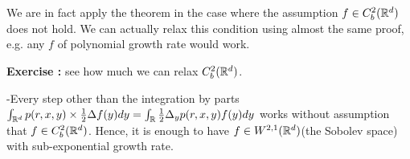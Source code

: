 \documentclass[10pt,a4paper]{report}
\newenvironment{proof}
{\begin{changemargin}{1cm}{0.5cm} 
	}%
	{\end{changemargin}
}
\begin{document}
We are in fact apply the theorem in the case where the assumption $f \in C_b^2(\mathbb{R}^d)$ does not hold. We can actually relax this condition using almost the same proof, e.g. any $f$ of polynomial growth rate would work.
\s

\textbf{Exercise :} see how much we can relax $C_b^2(\mathbb{R}^d)$.
\begin{proof}
-Every step other than the integration by parts $\int_{\mathbb{R}^d} p(r,x,y) \times \frac{1}{2} \Delta f(y) dy = \int_{\mathbb{R}} \frac{1}{2} \Delta_y p(r,x,y) f(y) dy$ works without assumption that $f\in C_b^2(\mathbb{R}^d)$. Hence, it is enough to have $f \in W^{2,1}(\mathbb{R}^d)$(the Sobolev space) with sub-exponential growth rate.
\end{proof}
\end{document}
